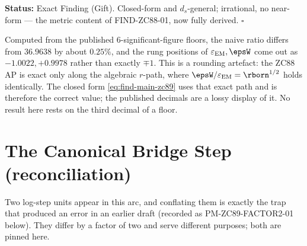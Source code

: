 \documentclass[12pt, a4paper]{article}
\renewcommand{\epsEM}{\varepsilon_{\rm EM}}     %
\begin{document}
\begin{giftbox}[title={FIND-ZC89-01: $\sGamma/\smetric
  = 2^{d_s}\ln2/[\ln(d_s(2^{d_s}\!-\!d_s))\,\ln\rborn]$ ($R_0$, Exact ---
  closes GAP-ZC88-01 and GAP-ZC89-01)}]
\textbf{Status:} Exact Finding (Gift). Closed-form and $d_s$-general;
irrational, no near-form --- the metric content of FIND-ZC88-01, now fully
derived. \hfill$\square$
\end{giftbox}

\begin{derivedbox}[title={On the rounding artefact (honest note)}]
Computed from the published 6-significant-figure floors, the naive ratio
differs from $36.9638$ by about $0.25\%$, and the rung positions of
$\epsEM,\epsW$ come out as $-1.0022,+0.9978$ rather than exactly
$\mp 1$. This is a rounding artefact: the ZC88 AP is exact only along the
algebraic $r$-path, where $\epsW/\epsEM=\rborn^{1/2}$ holds identically. The
closed form \eqref{eq:find-main-zc89} uses that exact path and is therefore the
correct value; the published decimals are a lossy display of it. No result
here rests on the third decimal of a floor.
\end{derivedbox}

\section{The Canonical Bridge Step (reconciliation)}
\label{sec:stepdef-zc89}

Two log-step units appear in this arc, and conflating them is exactly the
trap that produced an error in an earlier draft (recorded as
PM-ZC89-FACTOR2-01 below). They differ by a factor of two and serve
different purposes; both are pinned here.
\end{document}
